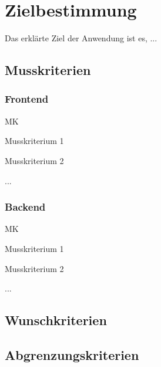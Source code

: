 \section{Zielbestimmung}
Das erklärte Ziel der Anwendung ist es, ...

\subsection{Musskriterien}
\setcounter{counter}{10}

\subsubsection{Frontend}
\begin{Kriterien}{MK}

	\item Musskriterium 1

	\item Musskriterium 2
	
	\item ...

\end{Kriterien}

\subsubsection{Backend}
\begin{Kriterien}{MK}

	\item Musskriterium 1

	\item Musskriterium 2
	
	\item ...


\end{Kriterien}

\newpage
\subsection{Wunschkriterien}

\subsection{Abgrenzungskriterien}
